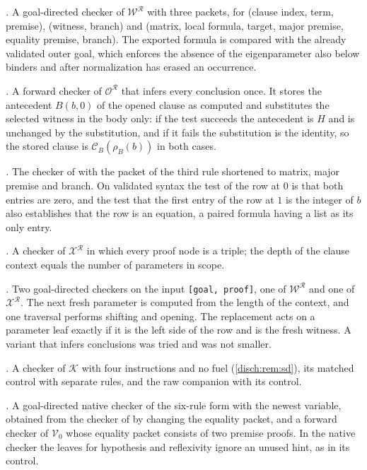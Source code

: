 \emph{.} A goal-directed checker of
$\mathcal W^{\mathcal R}$ with three packets, for  (clause
index, term, premise),  (witness, branch) and
 (matrix, local formula, target, major premise, equality
premise, branch). The exported formula is compared with the already
validated outer goal, which enforces the absence of the eigenparameter
also below binders and after normalization has erased an occurrence.

\emph{.} A forward checker of
$\mathcal O^{\mathcal R}$ that infers every conclusion once. It stores the
antecedent $B(b,0)$ of the opened clause as computed and substitutes the
selected witness in the body only: if the test succeeds the antecedent is
$H$ and is unchanged by the substitution, and if it fails the substitution
is the identity, so the stored clause is $\mathcal C_B(\rho_B(b))$ in both
cases.

\emph{.} The checker of
 with the packet of the third rule shortened to
matrix, major premise and branch. On validated syntax the test of the row
at $0$ is that both entries are zero, and the test that the first entry of
the row at $1$ is the integer of $b$ also establishes that the row is an
equation, a paired formula having a list as its only entry.

\emph{.} A checker of $\mathcal X^{\mathcal R}$ in
which every proof node is a triple; the depth of the clause context equals
the number of parameters in scope.

\emph{.} Two goal-directed checkers on the input
\texttt{[goal, proof]}, one of $\mathcal W^{\mathcal R}$ and one of
$\mathcal X^{\mathcal R}$. The next fresh parameter is computed from the
length of the context, and one traversal performs shifting and opening.
The replacement acts on a parameter leaf exactly if it is the left side of
the row and is the fresh witness. A variant that infers conclusions was
tried and was not smaller.

\emph{.} A checker of $\mathcal K$ with four
instructions and no fuel (\cref{disch:rem:sd}), its matched control with
separate rules, and the raw companion with its control.

\emph{.} A goal-directed native checker of the
six-rule form with the newest variable, obtained from the checker of
 by changing the equality packet, and a forward
checker of $\mathcal V_0$ whose equality packet consists of two premise
proofs. In the native checker the leaves for hypothesis and reflexivity
ignore an unused hint, as in its control.

